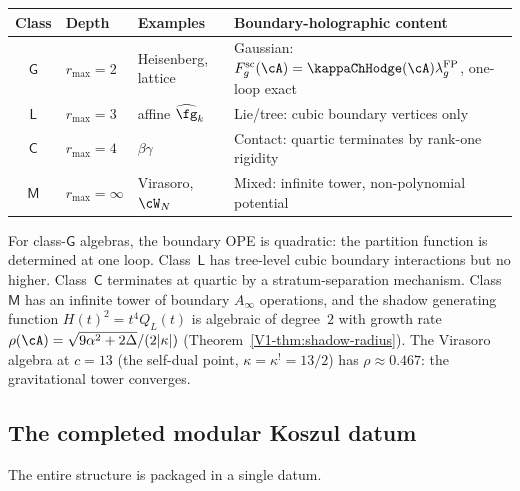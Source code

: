 \begin{center}
\renewcommand{\arraystretch}{1.3}
\begin{tabular}{clll}
\textbf{Class} & \textbf{Depth} & \textbf{Examples}
 & \textbf{Boundary-holographic content} \\
\hline
$\mathsf{G}$ & $r_{\max} = 2$ & Heisenberg, lattice
 & Gaussian:
 $F_g^{\mathrm{sc}}(\cA)=\kappaChHodge(\cA)\lambda_g^{\mathrm{FP}}$,
 one-loop exact \\
$\mathsf{L}$ & $r_{\max} = 3$ & affine $\widehat{\fg}_k$
 & Lie/tree: cubic boundary vertices only \\
$\mathsf{C}$ & $r_{\max} = 4$ & $\beta\gamma$
 & Contact: quartic terminates by rank-one rigidity \\
$\mathsf{M}$ & $r_{\max} = \infty$ & Virasoro, $\cW_N$
 & Mixed: infinite tower, non-polynomial potential \\
\end{tabular}
\end{center}

For class-$\mathsf{G}$ algebras, the boundary OPE is quadratic:
the partition function is determined at one loop. Class~$\mathsf{L}$
has tree-level cubic boundary interactions but no higher.
Class~$\mathsf{C}$ terminates at quartic by a stratum-separation
mechanism. Class~$\mathsf{M}$ has an infinite tower of
boundary $A_\infty$ operations, and the shadow generating function
$H(t)^2 = t^4 Q_L(t)$ is algebraic of degree~$2$ with
growth rate $\rho(\cA) = \sqrt{9\alpha^2 + 2\Delta}/(2|\kappa|)$
(Theorem~\ref*{V1-thm:shadow-radius}). The Virasoro algebra at
$c = 13$ (the self-dual point, $\kappa = \kappa^! = 13/2$) has
$\rho \approx 0.467$: the gravitational tower converges.

\subsection{The completed modular Koszul datum}

The entire structure is packaged in a single datum.

